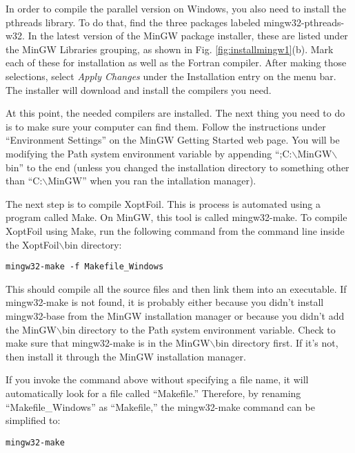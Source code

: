 \documentclass[11pt]{article}
\begin{document}
In order to compile the parallel version on Windows, you also need to install the pthreads
library.  To do that, find the three packages labeled mingw32-pthreads-w32.  In the latest
version of the MinGW package installer, these are listed under the MinGW Libraries
grouping, as shown in Fig. \ref{fig:installmingw1}(b).  Mark each of these for
installation as well as the Fortran compiler. After making those selections, select
\textit{Apply Changes} under the Installation entry on the menu bar.  The installer will 
download and install the compilers you need.

At this point, the needed compilers are installed.  The next thing you need to do is to
make sure your computer can find them.  Follow the instructions under ``Environment
Settings'' on the MinGW Getting Started web page.  You will be modifying the Path
system environment variable by appending ``;C:$\backslash$MinGW$\backslash$bin''
to the end (unless you changed the installation directory to something other than
``C:$\backslash$MinGW'' when you ran the intallation manager).

The next step is to compile XoptFoil. This is process is automated using a program called
Make.  On MinGW, this tool is called mingw32-make.  To compile XoptFoil using Make, run the
following command from the command line inside the XoptFoil$\backslash$bin directory:

\begin{verbatim}
mingw32-make -f Makefile_Windows
\end{verbatim}

This should compile all the source files and then link them into an executable.  If
mingw32-make is not found, it is probably either because you didn't install mingw32-base
from the MinGW installation manager or because you didn't add the MinGW$\backslash$bin
directory to the Path system environment variable.  Check to make sure that mingw32-make
is in the MinGW$\backslash$bin directory first.  If it's not, then install it through the
MinGW installation manager.

If you invoke the command above without specifying a file name, it will automatically look
for a file called ``Makefile.''  Therefore, by renaming ``Makefile\_Windows'' as
``Makefile,'' the mingw32-make command can be simplified to:

\begin{verbatim}
mingw32-make
\end{verbatim}
\end{document}
